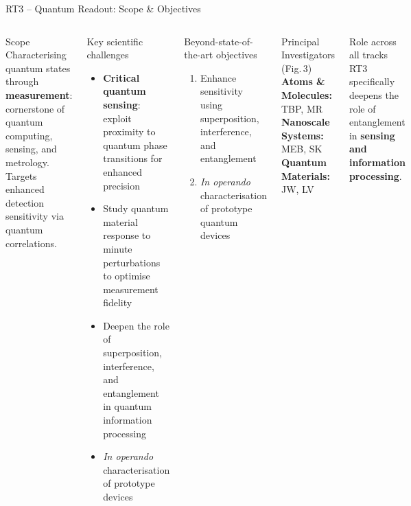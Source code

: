 \documentclass[aspectratio=169,10pt]{beamer}
\begin{document}
\begin{frame}{RT3 -- Quantum Readout: Scope \& Objectives}
  \begin{columns}[T]
      \begin{block}{Scope}
        Characterising quantum states through \textbf{measurement}:
        cornerstone of quantum computing, sensing, and metrology.
        Targets enhanced detection sensitivity via quantum correlations.
      \end{block}
      \vspace{2pt}
      \begin{block}{Key scientific challenges}
        \begin{itemize}
          \item \textbf{Critical quantum sensing}: exploit proximity to
                quantum phase transitions for enhanced precision
          \item Study quantum material response to minute perturbations
                to optimise measurement fidelity
          \item Deepen the role of superposition, interference, and
                entanglement in quantum information processing
          \item \emph{In operando} characterisation of prototype devices
        \end{itemize}
      \end{block}
      \begin{alertblock}{Beyond-state-of-the-art objectives}
        \begin{enumerate}
          \item Enhance sensitivity using superposition,
                interference, and entanglement
          \item \textit{In operando} characterisation of
                prototype quantum devices
        \end{enumerate}
      \end{alertblock}
      \vspace{2pt}
      \begin{block}{Principal Investigators (Fig.\,3)}
        \textbf{Atoms \& Molecules:} TBP, MR\\[2pt]
        \textbf{Nanoscale Systems:} MEB, SK\\[2pt]
        \textbf{Quantum Materials:} JW, LV
      \end{block}
      \vspace{2pt}
      \begin{block}{Role across all tracks}
        RT3 specifically deepens the role of entanglement
        in \textbf{sensing and information processing}.
      \end{block}
  \end{columns}
\end{frame}
\end{document}
